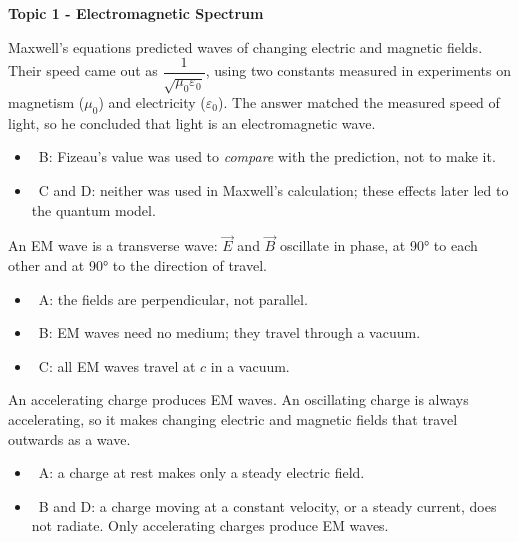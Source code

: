 \documentclass[12pt]{article}
\newcommand\anstopic[1]{\par\Needspace{8\baselineskip}\vspace{4mm}%
  \begin{center}{\headfont\bfseries\fontsize{14}{18}\selectfont #1\par}\end{center}\vspace{2pt}}
\begin{document}
\begin{practiceanswers}

\anstopic{Topic 1 - Electromagnetic Spectrum}

\begin{practiceans}
  Maxwell's equations predicted waves of changing electric and magnetic fields. Their speed came out
  as $\dfrac{1}{\sqrt{\mu_0\varepsilon_0}}$, using two constants measured in experiments on magnetism
  ($\mu_0$) and electricity ($\varepsilon_0$). The answer matched the measured speed of light, so he
  concluded that light is an electromagnetic wave.
  \begin{itemize}
    \item \xmark\ B: Fizeau's value was used to \emph{compare} with the prediction, not to make it.
    \item \xmark\ C and D: neither was used in Maxwell's calculation; these effects later led to the
          quantum model.
  \end{itemize}
\end{practiceans}

\begin{practiceans}
  An EM wave is a transverse wave: $\vec{E}$ and $\vec{B}$ oscillate in phase, at \ang{90} to each other
  and at \ang{90} to the direction of travel.
  \begin{itemize}
    \item \xmark\ A: the fields are perpendicular, not parallel.
    \item \xmark\ B: EM waves need no medium; they travel through a vacuum.
    \item \xmark\ C: all EM waves travel at $c$ in a vacuum.
  \end{itemize}
\end{practiceans}

\begin{practiceans}
  An accelerating charge produces EM waves. An oscillating charge is always accelerating, so it makes
  changing electric and magnetic fields that travel outwards as a wave.
  \begin{itemize}
    \item \xmark\ A: a charge at rest makes only a steady electric field.
    \item \xmark\ B and D: a charge moving at a constant velocity, or a steady current, does not
          radiate. Only accelerating charges produce EM waves.
  \end{itemize}
\end{practiceans}


\end{practiceanswers}
\end{document}
